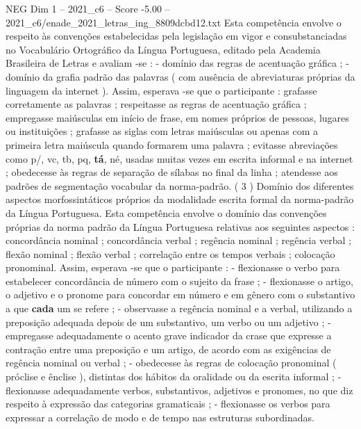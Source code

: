 \begin{textsample}{NEG Dim 1 – 2021\_c6 – Score -5.00 – 2021\_c6/enade\_2021\_letras\_ing\_8809dcbd12.txt}
Esta competência envolve o respeito às convenções estabelecidas pela legislação em vigor e consubstanciadas no Vocabulário Ortográfico da Língua Portuguesa, editado pela Academia Brasileira de Letras e avaliam -se : - domínio das regras de acentuação gráfica ; - domínio da grafia padrão das palavras ( com ausência de abreviaturas próprias da linguagem da internet ).
Assim, esperava -se que o participante : grafasse corretamente as palavras ; respeitasse as regras de acentuação gráfica ; empregasse maiúsculas em início de frase, em nomes próprios de pessoas, lugares ou instituições ; grafasse as siglas com letras maiúsculas ou apenas com a primeira letra maiúscula quando formarem uma palavra ; evitasse abreviações como p/, vc, tb, pq, \textbf{tá}, né, usadas muitas vezes em escrita informal e na internet ; obedecesse às regras de separação de sílabas no final da linha ; atendesse aos padrões de segmentação vocabular da norma-padrão. ( 3 ) Domínio dos diferentes aspectos morfossintáticos próprios da modalidade escrita formal da norma-padrão da Língua Portuguesa.
Esta competência envolve o domínio das convenções próprias da norma padrão da Língua Portuguesa relativas aos seguintes aspectos : concordância nominal ; concordância verbal ; regência nominal ; regência verbal ; flexão nominal ; flexão verbal ; correlação entre os tempos verbais ; colocação pronominal.
Assim, esperava -se que o participante : - flexionasse o verbo para estabelecer concordância de número com o sujeito da frase ; - flexionasse o artigo, o adjetivo e o pronome para concordar em número e em gênero com o substantivo a que \textbf{cada} um se refere ; - observasse a regência nominal e a verbal, utilizando a preposição adequada depois de um substantivo, um verbo ou um adjetivo ; - empregasse adequadamente o acento grave indicador da crase que expresse a contração entre uma preposição e um artigo, de acordo com as exigências de regência nominal ou verbal ; - obedecesse às regras de colocação pronominal ( próclise e ênclise ), distintas dos hábitos da oralidade ou da escrita informal ; - flexionasse adequadamente verbos, substantivos, adjetivos e pronomes, no que diz respeito à expressão das categorias gramaticais ; - flexionasse os verbos para expressar a correlação de modo e de tempo nas estruturas subordinadas.

\end{textsample}
